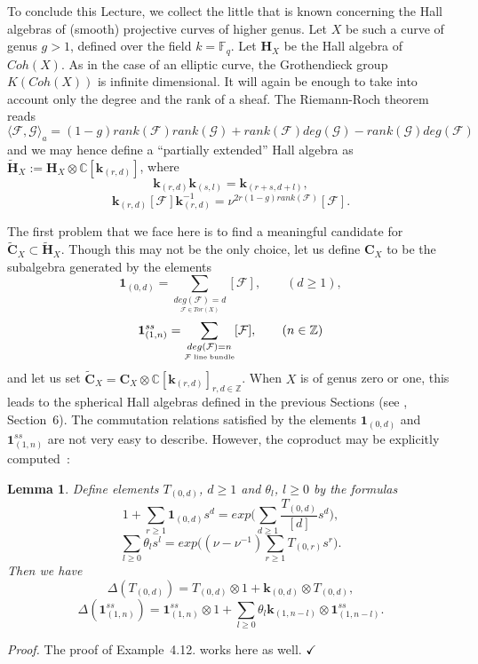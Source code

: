 \documentclass[a4paper,10pt]{amsart}
\def\Z{\mathbb{Z}}
\def\H{\mathbf{H}}
\def\qed{$\hfill \checkmark$}
\def\C{\mathbb{C}}
\def\CC{\mathbf{C}}
\newtheorem{lem}[theo]{Lemma}
\numberwithin{equation}{section}
\begin{document}
{To conclude this Lecture, we collect the little that is known concerning the Hall algebras of (smooth) projective curves of higher genus. Let $X$ be such a curve of genus $g>1$, defined over the field $k=\mathbb{F}_q$. Let $\H_{X}$ be the Hall algebra of $Coh(X)$. As in the case of an elliptic curve, the Grothendieck group $K(Coh(X))$ is infinite dimensional. It will again be enough to take into account only the degree and the rank of a sheaf. The Riemann-Roch theorem reads
$$\langle \mathcal{F},\mathcal{G}\rangle_a=(1-g)rank(\mathcal{F})rank(\mathcal{G})+rank(\mathcal{F}) deg(\mathcal{G})-rank(\mathcal{G})deg(\mathcal{F})$$
and we may hence define a ``partially extended'' Hall algebra as $\widetilde{\H}_X:=\H_{X} \otimes \C[\mathbf{k}_{(r,d)}]$, where
$$\mathbf{k}_{(r,d)} \mathbf{k}_{(s,l)}=\mathbf{k}_{(r+s,d+l)},$$
$$\mathbf{k}_{(r,d)} [\mathcal{F}] \mathbf{k}^{-1}_{(r,d)}=\nu^{2r(1-g)rank(\mathcal{F})}[\mathcal{F}].$$

\vspace{.1in}

The first problem that we face here is to find a meaningful candidate for
$\widetilde{\CC}_{X} \subset \widetilde{\H}_X$. Though this may not be the only choice, let us define $\CC_X$ to be the subalgebra generated by the elements
$$\mathbf{1}_{(0,d)}=\sum_{\underset{\mathcal{F} \in Tor(X)}{deg(\mathcal{F})=d}}[\mathcal{F}],\qquad (d \geq 1),$$
$$\mathbf{1}^{ss}_{(1,n)}=\sum_{\underset{\mathcal{F} \;\text{line\;bundle}}{deg(\mathcal{F})=n}}[\mathcal{F}],\qquad (n \in \Z)$$
and let us set $\widetilde{\CC}_X=\CC_X \otimes \C[\mathbf{k}_{(r,d)}]_{r,d \in \Z}$.
When $X$ is of genus zero or one, this leads to the spherical Hall algebras defined in the previous Sections (see \cite{SV}, Section~6). The commutation relations satisfied by the elements $\mathbf{1}_{(0,d)}$ and $\mathbf{1}^{ss}_{(1,n)}$ are not very easy to describe. However, the coproduct may be explicitly computed~:

\vspace{.1in}

\begin{lem}\label{L:copgenus} Define elements $T_{(0,d)}$, $d \geq 1$ and $\theta_l$, $l \geq 0$ by the formulas
$$1+\sum_{r \geq 1} \mathbf{1}_{(0,d)}s^d=exp\bigg(\sum_{d \geq 1} \frac{T_{(0,d)}}{[d]}s^d\bigg),$$
$$\sum_{l \geq 0} \theta_l s^l=exp\bigg((\nu-\nu^{-1})\sum_{ r \geq 1} T_{(0,r)}s^r\bigg).$$
Then we have
\begin{equation}\label{E:coprodgenus1}
{\Delta}(T_{(0,d)})=T_{(0,d)} \otimes 1 + \mathbf{k}_{(0,d)}\otimes T_{(0,d)},
\end{equation}
\begin{equation}\label{E:coprodgenus2}
{\Delta}(\mathbf{1}^{ss}_{(1,n)})=\mathbf{1}^{ss}_{(1,n)} \otimes 1 + \sum_{l \geq 0} \theta_l \mathbf{k}_{(1,n-l)} \otimes \mathbf{1}^{ss}_{(1,n-l)}.
\end{equation}
\end{lem}
\noindent
\textit{Proof.} The proof of Example~4.12. works here as well. \qed

}
\end{document}
